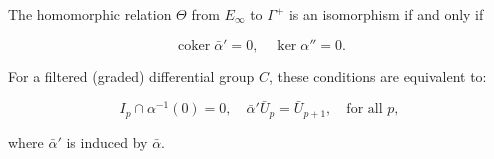 The homomorphic relation $\Theta$ from $E_\infty$ to $\Gamma^+$ is an isomorphism if and only if

$$\operatorname{coker} \bar{\alpha}' = 0, \quad \ker \alpha'' = 0.$$

For a filtered (graded) differential group $C$, these conditions are equivalent to:

$$I_p \cap \alpha^{-1}(0) = 0, \quad \bar{\alpha}' \bar{U}_p = \bar{U}_{p+1}, \quad \text{for all } p,$$

where $\bar{\alpha}'$ is induced by $\bar{\alpha}$.

